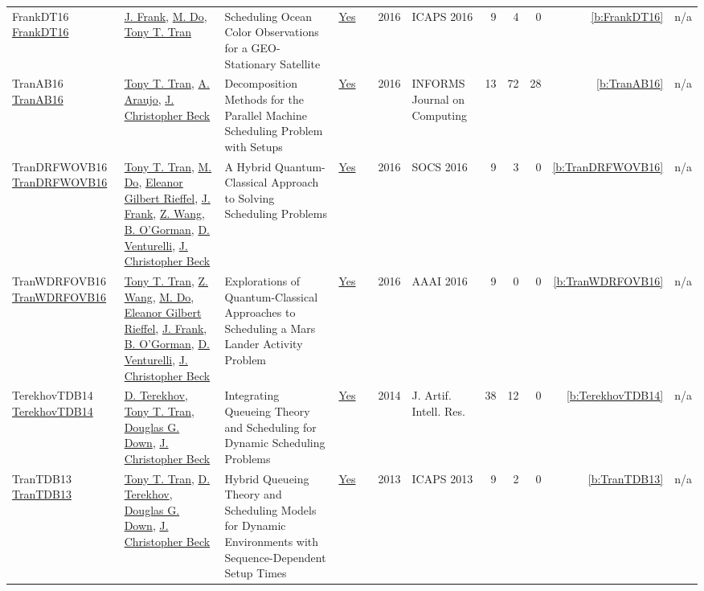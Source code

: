 {\begin{longtable}{>{\raggedright\arraybackslash}p{3cm}>{\raggedright\arraybackslash}p{6cm}>{\raggedright\arraybackslash}p{6.5cm}rrrp{2.5cm}rrrrr}
FrankDT16 \href{http://www.aaai.org/ocs/index.php/ICAPS/ICAPS16/paper/view/13072}{FrankDT16} & \hyperref[auth:a382]{J. Frank}, \hyperref[auth:a815]{M. Do}, \hyperref[auth:a805]{Tony T. Tran} & Scheduling Ocean Color Observations for a GEO-Stationary Satellite & \href{../works/FrankDT16.pdf}{Yes} & \cite{FrankDT16} & 2016 & ICAPS 2016 & 9 & 4 & 0 & \ref{b:FrankDT16} & n/a\\
TranAB16 \href{https://doi.org/10.1287/ijoc.2015.0666}{TranAB16} & \hyperref[auth:a805]{Tony T. Tran}, \hyperref[auth:a813]{A. Araujo}, \hyperref[auth:a89]{J. Christopher Beck} & Decomposition Methods for the Parallel Machine Scheduling Problem with Setups & \href{../works/TranAB16.pdf}{Yes} & \cite{TranAB16} & 2016 & INFORMS Journal on Computing & 13 & 72 & 28 & \ref{b:TranAB16} & n/a\\
TranDRFWOVB16 \href{https://doi.org/10.1609/socs.v7i1.18390}{TranDRFWOVB16} & \hyperref[auth:a805]{Tony T. Tran}, \hyperref[auth:a815]{M. Do}, \hyperref[auth:a816]{Eleanor Gilbert Rieffel}, \hyperref[auth:a382]{J. Frank}, \hyperref[auth:a814]{Z. Wang}, \hyperref[auth:a817]{B. O'Gorman}, \hyperref[auth:a818]{D. Venturelli}, \hyperref[auth:a89]{J. Christopher Beck} & A Hybrid Quantum-Classical Approach to Solving Scheduling Problems & \href{../works/TranDRFWOVB16.pdf}{Yes} & \cite{TranDRFWOVB16} & 2016 & SOCS 2016 & 9 & 3 & 0 & \ref{b:TranDRFWOVB16} & n/a\\
TranWDRFOVB16 \href{http://www.aaai.org/ocs/index.php/WS/AAAIW16/paper/view/12664}{TranWDRFOVB16} & \hyperref[auth:a805]{Tony T. Tran}, \hyperref[auth:a814]{Z. Wang}, \hyperref[auth:a815]{M. Do}, \hyperref[auth:a816]{Eleanor Gilbert Rieffel}, \hyperref[auth:a382]{J. Frank}, \hyperref[auth:a817]{B. O'Gorman}, \hyperref[auth:a818]{D. Venturelli}, \hyperref[auth:a89]{J. Christopher Beck} & Explorations of Quantum-Classical Approaches to Scheduling a Mars Lander Activity Problem & \href{../works/TranWDRFOVB16.pdf}{Yes} & \cite{TranWDRFOVB16} & 2016 & AAAI 2016 & 9 & 0 & 0 & \ref{b:TranWDRFOVB16} & n/a\\
TerekhovTDB14 \href{https://doi.org/10.1613/jair.4278}{TerekhovTDB14} & \hyperref[auth:a824]{D. Terekhov}, \hyperref[auth:a805]{Tony T. Tran}, \hyperref[auth:a809]{Douglas G. Down}, \hyperref[auth:a89]{J. Christopher Beck} & Integrating Queueing Theory and Scheduling for Dynamic Scheduling Problems & \href{../works/TerekhovTDB14.pdf}{Yes} & \cite{TerekhovTDB14} & 2014 & J. Artif. Intell. Res. & 38 & 12 & 0 & \ref{b:TerekhovTDB14} & n/a\\
TranTDB13 \href{http://www.aaai.org/ocs/index.php/ICAPS/ICAPS13/paper/view/6005}{TranTDB13} & \hyperref[auth:a805]{Tony T. Tran}, \hyperref[auth:a824]{D. Terekhov}, \hyperref[auth:a809]{Douglas G. Down}, \hyperref[auth:a89]{J. Christopher Beck} & Hybrid Queueing Theory and Scheduling Models for Dynamic Environments with Sequence-Dependent Setup Times & \href{../works/TranTDB13.pdf}{Yes} & \cite{TranTDB13} & 2013 & ICAPS 2013 & 9 & 2 & 0 & \ref{b:TranTDB13} & n/a\\

\end{longtable}}
